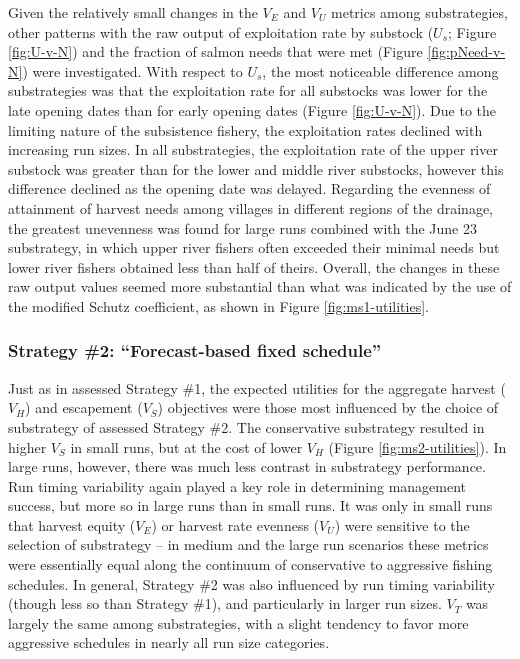 \documentclass[12pt,]{book}
\theoremstyle{definition}
\theoremstyle{definition}
\theoremstyle{definition}
\theoremstyle{remark}
\begin{document}
Given the relatively small changes in the \(V_E\) and \(V_U\) metrics
among substrategies, other patterns with the raw output of exploitation
rate by substock (\(U_s\); Figure \ref{fig:U-v-N}) and the fraction of
salmon needs that were met (Figure \ref{fig:pNeed-v-N}) were
investigated. With respect to \(U_s\), the most noticeable difference
among substrategies was that the exploitation rate for all substocks was
lower for the late opening dates than for early opening dates (Figure
\ref{fig:U-v-N}). Due to the limiting nature of the subsistence fishery,
the exploitation rates declined with increasing run sizes. In all
substrategies, the exploitation rate of the upper river substock was
greater than for the lower and middle river substocks, however this
difference declined as the opening date was delayed. Regarding the
evenness of attainment of harvest needs among villages in different
regions of the drainage, the greatest unevenness was found for large
runs combined with the June 23 substrategy, in which upper river fishers
often exceeded their minimal needs but lower river fishers obtained less
than half of theirs. Overall, the changes in these raw output values
seemed more substantial than what was indicated by the use of the
modified Schutz coefficient, as shown in Figure \ref{fig:ms1-utilities}.

\subsubsection{\texorpdfstring{Strategy \#2: ``Forecast-based fixed
schedule''}{Strategy \#2: Forecast-based fixed schedule}}\label{strategy-2-forecast-based-fixed-schedule-1}

\noindent
Just as in assessed Strategy \#1, the expected utilities for the
aggregate harvest (\(V_H\)) and escapement (\(V_S\)) objectives were
those most influenced by the choice of substrategy of assessed Strategy
\#2. The conservative substrategy resulted in higher \(V_S\) in small
runs, but at the cost of lower \(V_H\) (Figure \ref{fig:ms2-utilities}).
In large runs, however, there was much less contrast in substrategy
performance. Run timing variability again played a key role in
determining management success, but more so in large runs than in small
runs. It was only in small runs that harvest equity (\(V_E\)) or harvest
rate evenness (\(V_U\)) were sensitive to the selection of substrategy
-- in medium and the large run scenarios these metrics were essentially
equal along the continuum of conservative to aggressive fishing
schedules. In general, Strategy \#2 was also influenced by run timing
variability (though less so than Strategy \#1), and particularly in
larger run sizes. \(V_T\) was largely the same among substrategies, with
a slight tendency to favor more aggressive schedules in nearly all run
size categories.
\end{document}
